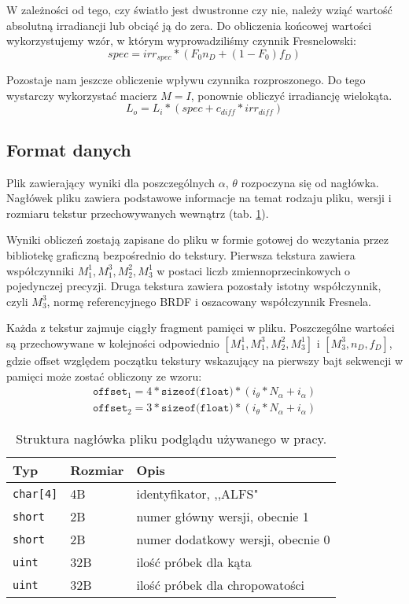 \documentclass[../main.tex]{subfiles}
\begin{document}
W zależności od tego, czy światło jest dwustronne czy nie, należy wziąć wartość absolutną irradiancji lub obciąć ją do zera. Do obliczenia końcowej wartości wykorzystujemy wzór, w którym wyprowadziliśmy czynnik Fresnelowski:
\[
    spec = irr_{spec} * (F_0 n_D + (1-F_0) f_D)
\]

Pozostaje nam jeszcze obliczenie wpływu czynnika rozproszonego. Do tego wystarczy wykorzystać macierz $M=I$, ponownie obliczyć irradiancję wielokąta. 
\[
    L_o = L_i * \left( spec + c_{diff}*irr_{diff} \right)
\]

\subsection{Format danych}

Plik zawierający wyniki dla poszczególnych $\alpha$, $\theta$ rozpoczyna się od nagłówka. Nagłówek pliku zawiera podstawowe informacje na temat rodzaju pliku, wersji i rozmiaru tekstur przechowywanych wewnątrz (tab. \ref{table:ALFHeader}).

Wyniki obliczeń zostają zapisane do pliku w formie gotowej do wczytania przez bibliotekę graficzną bezpośrednio do tekstury. Pierwsza tekstura zawiera współczynniki $M_{1}^{1}, M_{1}^{3}, M_{2}^{2}, M_{3}^{1}$ w postaci liczb zmiennoprzecinkowych o pojedynczej precyzji. Druga tekstura zawiera pozostały istotny współczynnik, czyli $M_{3}^{3}$, normę referencyjnego BRDF i oszacowany współczynnik Fresnela.

Każda z tekstur zajmuje ciągły fragment pamięci w pliku. Poszczególne wartości są przechowywane w kolejności odpowiednio $[M_{1}^{1}, M_{1}^{3}, M_{2}^{2}, M_{3}^{1}]$ i $[M_{3}^{3}, n_D, f_D]$, gdzie offset względem początku tekstury wskazujący na pierwszy bajt sekwencji w pamięci może zostać obliczony ze wzoru:
\begin{gather*}
\texttt{offset}_1 = 4 * \texttt{sizeof(float)} * \left(
i_{\theta} * N_{\alpha} + i_{\alpha}
\right) \\
\texttt{offset}_2 = 3 * \texttt{sizeof(float)} * \left(
i_{\theta} * N_{\alpha} + i_{\alpha}
\right)
\end{gather*}

\begin{table}[h]
    \centering
    \begin{tabular}{|l|l|l|}
        \hline
        Typ & Rozmiar & Opis \\ \hline
        \texttt{char[4]} & 4B & identyfikator, ,,ALFS" \\\hline
        \texttt{short} & 2B & numer główny wersji, obecnie 1 \\\hline
        \texttt{short} & 2B & numer dodatkowy wersji, obecnie 0 \\\hline
        \texttt{uint} & 32B & ilość próbek dla kąta \\\hline
        \texttt{uint} & 32B & ilość próbek dla chropowatości \\\hline
    \end{tabular}
    \caption{Struktura nagłówka pliku podglądu używanego w pracy.}
    \label{table:ALFHeader}
\end{table}
\end{document}
